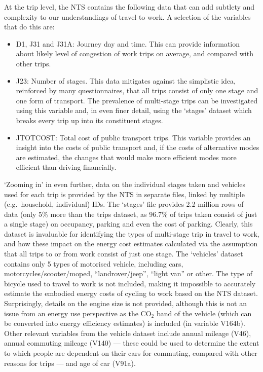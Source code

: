 \documentclass[a4paper, 11pt, twoside]{Thesis}
\begin{document}
At the trip level, the NTS contains the following data that can add subtlety
and complexity to our understandings of travel to work. A selection of the
variables that do this are:
\begin{itemize}
 \item D1, J31 and J31A: Journey day and time. This can provide information
about likely level of congestion of work trips on average, and compared with
other trips.
 \item J23: Number of stages. This data mitigates against the simplistic idea,
reinforced by many questionnaires, that all trips consist of only one stage and
one form of transport. The prevalence of multi-stage trips can be investigated
using this variable and, in even finer detail, using the `stages' dataset which
breaks every trip up into its constituent stages.	
 \item JTOTCOST: Total cost of public transport trips. This variable provides
an insight into the costs of public transport and, if the costs of alternative
modes are estimated, the changes that would make more efficient modes more
efficient than driving financially. 
\end{itemize}

`Zooming in' in even further, data on the individual stages taken and vehicles
used for each trip is provided by the NTS in separate files, linked by multiple
(e.g.~household, individual) IDs. The `stages' file 
provides 2.2 million rows of data (only 5\% more than the trips dataset, as
96.7\% of trips taken consist of just a single stage) on occupancy, parking and
even the cost of parking. Clearly, this dataset is invaluable for identifying
the types of multi-stage trip in travel to work, and how these impact on the
energy cost estimates calculated via the assumption that all trips to or from
work consist of just one stage. The `vehicles' dataset contains only 5 types of 
motorised vehicle, including cars, motorcycles/scooter/moped,
``landrover/jeep'', ``light van'' or other. The type of bicycle used to travel
to work is not included, making it impossible to accurately estimate the
embodied energy costs of cycling to work based on the NTS dataset.
Surprisingly, details on the engine size is not provided, although this is not
an issue from an energy use perspective as the CO$_{2}$ band of the vehicle
(which can be converted into energy efficiency estimates) 
is included (in variable V164b). Other relevant variables from the vehicle
dataset include annual mileage (V46), annual commuting mileage (V140) --- these
could be used to determine the extent to which people are dependent on their
cars for commuting, compared with other reasons for trips --- and age of car
(V91a).
\end{document}

